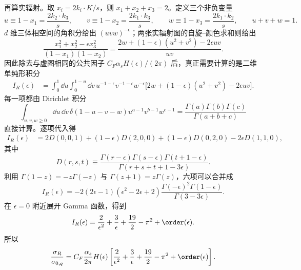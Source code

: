 \begin{derivation}
再算实辐射。取 $x_i=2k_i\!\cdot K/s$，则 $x_1+x_2+x_3=2$。定义三个非负变量
\begin{equation*}
 u\equiv1-x_1=\frac{2k_2\!\cdot k_3}{s},\qquad
 v\equiv1-x_2=\frac{2k_1\!\cdot k_3}{s},\qquad
 w\equiv1-x_3=\frac{2k_1\!\cdot k_2}{s},
 \qquad u+v+w=1.
\end{equation*}
$d$ 维三体相空间的角积分给出 $(uvw)^{-\epsilon}$；两张实辐射图的自旋--颜色求和则给出
\begin{equation*}
 \frac{x_1^2+x_2^2-\epsilon x_3^2}{(1-x_1)(1-x_2)}
 =\frac{2w+(1-\epsilon)(u^2+v^2)-2\epsilon uv}{uv}.
\end{equation*}
因此除去与虚图相同的公共因子 $C_F\alpha_sH(\epsilon)/(2\pi)$ 后，真正需要计算的是二维单纯形积分
\begin{align*}
 I_R(\epsilon)
 &=\int_0^1\dd u\int_0^{1-u}\dd v\,
 u^{-1-\epsilon}v^{-1-\epsilon}w^{-\epsilon}
 \bigl[2w+(1-\epsilon)(u^2+v^2)-2\epsilon uv\bigr].
\end{align*}
每一项都由 Dirichlet 积分
\begin{equation*}
 \int_{u,v,w\ge0}\dd u\,\dd v\,
 \delta(1-u-v-w)u^{a-1}v^{b-1}w^{c-1}
 =\frac{\Gamma(a)\Gamma(b)\Gamma(c)}{\Gamma(a+b+c)}
\end{equation*}
直接计算。逐项代入得
\begin{align*}
 I_R(\epsilon)
 &=2D(0,0,1)+(1-\epsilon)D(2,0,0)
 +(1-\epsilon)D(0,2,0)-2\epsilon D(1,1,0),
\end{align*}
其中
\begin{equation*}
 D(r,s,t)
 \equiv
 \frac{\Gamma(r-\epsilon)\Gamma(s-\epsilon)\Gamma(t+1-\epsilon)}
 {\Gamma(r+s+t+1-3\epsilon)}.
\end{equation*}
利用 $\Gamma(1-z)=-z\Gamma(-z)$ 与 $\Gamma(z+1)=z\Gamma(z)$，六项可以合并成
\begin{equation*}
 I_R(\epsilon)
 =-2(2\epsilon-1)(\epsilon^2-2\epsilon+2)
 \frac{\Gamma(-\epsilon)^2\Gamma(1-\epsilon)}
 {\Gamma(3-3\epsilon)}.
\end{equation*}
在 $\epsilon=0$ 附近展开 Gamma 函数，得到
\begin{equation*}
 I_R(\epsilon)
 =\frac2{\epsilon^2}+\frac3\epsilon
 +\frac{19}{2}-\pi^2+\order(\epsilon).
\end{equation*}
所以
\begin{equation*}
 \frac{\sigma_R}{\sigma_{0,q}}
 =C_F\frac{\alpha_s}{2\pi}H(\epsilon)
 \left[\frac2{\epsilon^2}+\frac3\epsilon
 +\frac{19}{2}-\pi^2+\order(\epsilon)\right].
\end{equation*}


\end{derivation}
